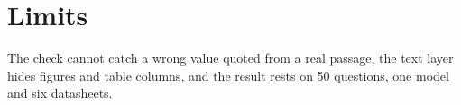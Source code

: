 \section{Limits}
\label{sec:limits}

The check cannot catch a wrong value quoted from a real passage, the text layer hides figures and table columns, and the result rests on 50 questions, one model and six datasheets.
